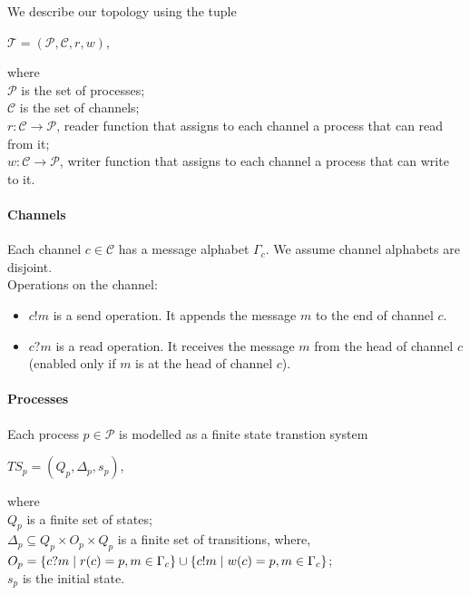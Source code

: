\documentclass[a4paper,UKenglish,cleveref, autoref, thm-restate]{lipics-v2019}
\begin{document}
We describe our topology using the tuple 
\begin{center}
$\mathcal{T}= (\mathcal{P}, \mathcal{C}, r, w)$,
\end{center}
where \\
\hspace*{0.8cm} $\mathcal{P}$ is the set of processes; \\
\hspace*{0.8cm} $\mathcal{C}$ is the set of channels; \\
\hspace*{0.8cm} $r:\mathcal{C}  \rightarrow \mathcal{P}$, reader function that assigns to each channel a process that can read from it;\\
\hspace*{0.8cm} $w:\mathcal{C} \rightarrow \mathcal{P}$, writer function that assigns to each channel a process that can write to it.


\paragraph*{Channels}

Each channel $c \in \mathcal{C}$ has a message alphabet $\Gamma_c$. We assume channel alphabets are disjoint.\\
Operations on the channel: 
\begin{itemize}
\item $c!m$ is a send operation. It appends the message $m$ to the end of channel $c$.
\item $c?m$ is a read operation. It receives the message $m$ from the head of channel $c$ (enabled only if $m$ is at the head of channel $c$).

\end{itemize}


\paragraph*{Processes}

Each process $p\in \mathcal{P}$ is modelled as a finite state transtion system 
\begin{center}
   $TS_p = (Q_p, \Delta_p, s_p)$,
\end{center}
where \\
\hspace*{0.5cm} $Q_p$ is a finite set of states;\\
\hspace*{0.5cm} $\Delta_p \subseteq Q_p \times O_p \times Q_p$ is a finite set of transitions, where, \\
\hspace*{2cm} $O_p = \{ c?m \hspace{1mm}| \hspace{1mm} r(c) = p,  m \in \Gamma_c\} \cup \{ c!m \hspace{1mm}| \hspace{1mm} w(c) = p, m \in \Gamma_c\}$; \\
\hspace*{0.5cm} $s_p$ is the initial state.
\end{document}
